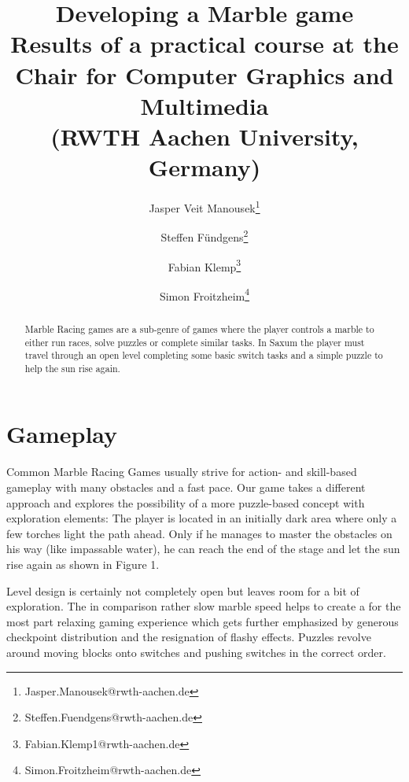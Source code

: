 \documentclass[sponsored]{acmsiggraph}
\title{Developing a Marble game \\ \large \normalfont Results of a practical
course at the Chair for Computer Graphics and Multimedia \\ (RWTH Aachen
University, Germany)}
\author{Jasper Veit Manousek\thanks{Jasper.Manousek@rwth-aachen.de} 
\and    Steffen F\"undgens\thanks{Steffen.Fuendgens@rwth-aachen.de} 
\and    Fabian Klemp\thanks{Fabian.Klemp1@rwth-aachen.de} 
\and    Simon Froitzheim\thanks{Simon.Froitzheim@rwth-aachen.de} }
\begin{document}

\maketitle

\begin{abstract}

Marble Racing games are a sub-genre of games where the player controls a marble to either run races, solve puzzles or complete similar tasks. In Saxum the player must travel through an open level completing some basic switch tasks and a simple puzzle to help the sun rise again.
 
\end{abstract}

\section{Gameplay}
Common Marble Racing Games usually strive for action- and skill-based gameplay with many obstacles and a fast pace. Our game takes a different approach and explores the possibility of a more puzzle-based concept with exploration elements: The player is located in an initially dark 
area where only a few torches light the path ahead. Only if he manages to master the obstacles on his way (like impassable water), he can reach the end of the stage and let the sun rise again as shown in Figure 1.

Level design is certainly not completely open but leaves room for a bit of exploration. The in comparison rather slow marble speed helps to create a for the most part relaxing gaming experience which gets further emphasized by generous checkpoint distribution and the resignation of flashy effects. Puzzles revolve around moving blocks onto switches and pushing switches in the correct order.
\end{document}

